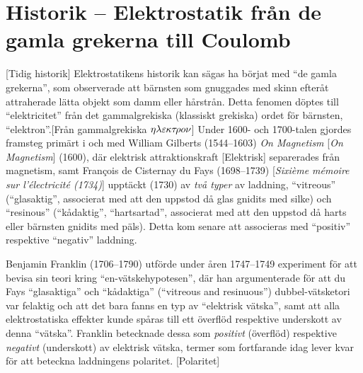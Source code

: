 {\section{Historik -- Elektrostatik fr{\aa}n de gamla grekerna till Coulomb}
[Tidig historik]
Elektrostatikens historik
kan s{\"a}gas ha b{\"o}rjat med ``de gamla grekerna'', som observerade att
b{\"a}rnsten som gnuggades med skinn efter{\aa}t attraherade l{\"a}tta objekt
som damm eller h{\aa}rstr{\aa}n. Detta fenomen d{\"o}ptes till ``elektricitet''
fr{\aa}n det gammalgrekiska (klassiskt grekiska) ordet f{\"o}r b{\"a}rnsten,
``elektron''.[Fr{\aa}n gammalgrekiska
  $\eta\lambda\varepsilon\kern-.4pt\kappa\tau\kern-1.4pt\rho o\nu$]
Under 1600- och 1700-talen gjordes framsteg prim{\"a}rt i och med William
Gilberts  (1544--1603)
{\it On Magnetism} [{{\it On Magnetism}}]
(1600), d{\"a}r elektrisk attraktionskraft [Elektrisk]
separerades fr{\aa}n magnetism, samt
Fran\c{c}ois de Cisternay du Fays (1698--1739) [{{\it Sixi\`eme m\'emoire sur l'\'electricit\'e
(1734)}}] uppt{\"a}ckt (1730) av {\it tv{\aa}
typer} av laddning, ``vitreous'' (``glasaktig'', associerat med att den uppstod
d{\aa} glas gnidits med silke) och ``resinous'' (``k{\aa}daktig'',
``hartsartad'', associerat med att den uppstod d{\aa} harts eller b{\"a}rnsten
gnidits med p{\"a}ls). Detta kom senare att associeras med ``positiv''
respektive ``negativ'' laddning.

Benjamin Franklin  (1706--1790)
utf{\"o}rde under {\aa}ren 1747--1749 experiment f{\"o}r att bevisa sin teori
kring ``en-v{\"a}tske\-hypo\-tesen'', d{\"a}r han argumenterade f{\"o}r att du
Fays ``glasaktiga'' och ``k{\aa}daktiga'' (``vitreous and resinuous'')
dubbel-v{\"a}tsketori var felaktig och att det bara fanns en typ av ``elektrisk
v{\"a}tska'', samt att alla elektrostatiska effekter kunde sp{\aa}ras till ett
{\"o}verfl{\"o}d respektive underskott av denna ``v{\"a}tska''.
Franklin betecknade dessa som {\it positivt} ({\"o}verfl{\"o}d) respektive
{\it negativt} (underskott) av elektrisk v{\"a}tska, termer som fortfarande
idag lever kvar f{\"o}r att beteckna laddningens polaritet.%
[Polaritet]

}
